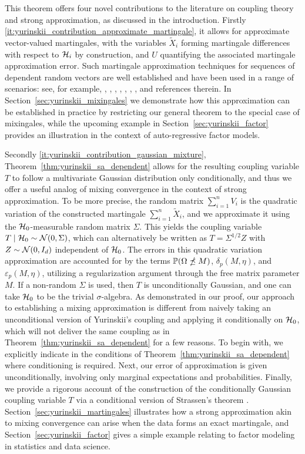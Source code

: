 This theorem offers four novel contributions to the literature on coupling
theory and strong approximation, as discussed in the introduction.
Firstly \ref{it:yurinskii_contribution_approximate_martingale}, it allows for
approximate
vector-valued martingales, with the variables $\tilde X_i$ forming martingale
differences with respect to $\cH_i$ by construction, and $U$ quantifying the
associated martingale approximation error. Such martingale approximation
techniques for sequences of dependent random vectors are well established and
have been used in a range of scenarios: see, for example,
\citet{wu2004martingale}, \citet{dedecker2007weak}, \citet{zhao2008martingale},
\citet{peligrad2010conditional}, \citet{atchade2014martingale},
\citet{cuny2014martingale}, \citet{magda2018martingale}, and references
therein. In Section~\ref{sec:yurinskii_mixingales} we demonstrate how this
approximation
can be established in practice by restricting our general theorem to the
special case of mixingales, while the upcoming example in
Section~\ref{sec:yurinskii_factor} provides an illustration in the context of
auto-regressive factor models.

Secondly \ref{it:yurinskii_contribution_gaussian_mixture},
Theorem~\ref{thm:yurinskii_sa_dependent} allows for the
resulting coupling variable $T$
to follow a multivariate Gaussian distribution only conditionally,
and thus we offer a useful analog of mixing convergence in the context
of strong approximation.
To be more precise, the random matrix $\sum_{i=1}^{n} V_i$
is the quadratic variation of the constructed martingale
$\sum_{i=1}^n \tilde X_i$, and we approximate it using the $\cH_0$-measurable
random matrix $\Sigma$. This yields the coupling variable
$T \mid \cH_0 \sim \cN(0, \Sigma)$, which can alternatively be written as
$T=\Sigma^{1/2} Z$ with $Z \sim \cN(0,I_d)$ independent of $\cH_0$.
The errors in this quadratic variation
approximation are accounted for by the terms
$\P(\Omega \npreceq M)$, $\delta_p(M, \eta)$, and $\varepsilon_p(M, \eta)$,
utilizing a regularization argument through the free matrix parameter $M$.
If a non-random $\Sigma$ is used, then $T$ is unconditionally Gaussian,
and one can take $\cH_0$ to be the trivial $\sigma$-algebra.
As demonstrated in our proof, our approach to establishing a
mixing approximation is different from naively taking an unconditional version
of Yurinskii's coupling and applying
it conditionally on $\cH_0$, which will not deliver the same coupling as in
Theorem~\ref{thm:yurinskii_sa_dependent} for a few reasons.
To begin with, we explicitly indicate in the
conditions of Theorem~\ref{thm:yurinskii_sa_dependent} where conditioning is
required.
Next, our error of approximation is given unconditionally,
involving only marginal expectations and probabilities.
Finally, we provide a rigorous account of the construction of the
conditionally Gaussian coupling variable $T$ via a conditional version
of Strassen's theorem \citep{chen2020jackknife}.
Section~\ref{sec:yurinskii_martingales}
illustrates how a strong approximation akin to
mixing convergence can arise when the data
forms an exact martingale, and Section~\ref{sec:yurinskii_factor} gives a
simple example
relating to factor modeling in statistics and data science.

